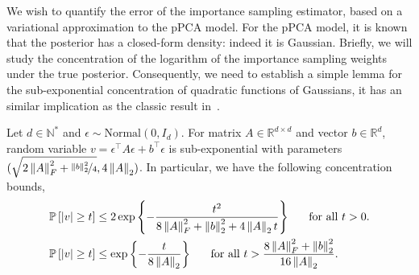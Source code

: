 We wish to quantify the error of the importance sampling estimator, based on a variational approximation to the pPCA model. For the pPCA model, it is known that the posterior has a closed-form density: indeed it is Gaussian. Briefly, we will study the concentration of the logarithm of the importance sampling weights under the true posterior. Consequently, we need to establish a simple lemma for the sub-exponential concentration of quadratic functions of Gaussians, it has an similar implication as the classic result in~\cite{laurent2000}.
\begin{lemma}
\label{lemma:sub_exp}
Let $d \in \mathbb{N}^*$ and $\epsilon \sim \mathrm{Normal}(0, I_d)$. For matrix $A \in \mathbb{R}^{d \times d}$ and vector $b \in \mathbb{R}^d$, random variable $v = \epsilon^\top A\epsilon + b^\top \epsilon$ is sub-exponential with parameters $(\sqrt{2\left\lVert A\right\rVert^2_F + \nicefrac{\left\lVert b\right\rVert_2^2}{4}}, 4\left\lVert A\right\rVert_2)$. In particular, we have the following concentration bounds,
\begin{align}
    \mathbb{P}\left[|v| \geq t\right] & \leq 2 \exp\left\{-\frac{t^2}{8\left\lVert A\right\rVert^2_F + \left\lVert b\right\rVert_2^2 + 4\left\lVert A\right\rVert_2t}\right\}~~~~~\textrm{for all}~t >0. \\
    \mathbb{P}\left[|v| \geq t\right] & \leq \exp\left\{-\frac{t}{8\left\lVert A\right\rVert_2}\right\}~~~~~\textrm{for all}~t > \frac{8\left\lVert A\right\rVert^2_F + \left\lVert b\right\rVert_2^2}{16\left\lVert A\right\rVert_2}. 
\end{align}
\end{lemma}
